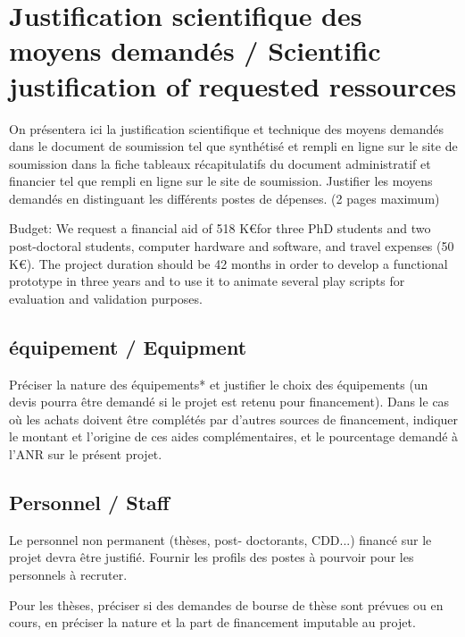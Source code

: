 
\section{Justification scientifique des moyens demand\'es / Scientific justification of requested ressources}
\begin{xcomment}  
On pr\'esentera ici la justification scientifique et technique des moyens demand\'es dans le document de soumission tel que synth\'etis\'e et rempli en ligne sur le site de soumission dans la fiche tableaux r\'ecapitulatifs  du document administratif et financier tel que rempli en ligne sur le site de soumission.
Justifier les moyens demand\'es en distinguant les diff\'erents postes de d\'epenses.
(2 pages maximum)
\end{xcomment}


Budget: We request a financial aid of 518  K\euro for three PhD students  and two post-doctoral students,  computer hardware and software, and
travel expenses (50 K\euro). The project duration should be 42 months in order to develop a functional prototype in three years 
and to use it to animate several play scripts for evaluation and validation purposes.


\subsection{\'equipement / Equipment}
\begin{xcomment}  
Pr\'eciser la nature des \'equipements* et justifier le choix des \'equipements (un devis pourra être demand\'e si le projet est retenu pour financement).
Dans le cas où les achats doivent être compl\'et\'es par d'autres sources de financement, indiquer le montant et l'origine de ces aides compl\'ementaires, et le pourcentage demand\'e à l'ANR sur le pr\'esent projet.
\end{xcomment}

\subsection{Personnel / Staff}
\begin{xcomment}  
Le personnel non permanent (th\`eses, post- doctorants, CDD...) financ\'e sur le projet devra être justifi\'e.
Fournir  les profils des postes à pourvoir pour les personnels à recruter.

Pour les th\`eses, pr\'eciser si des demandes de bourse de th\`ese sont pr\'evues ou en cours, en pr\'eciser la nature et la part de financement imputable au projet. 
\end{xcomment}

